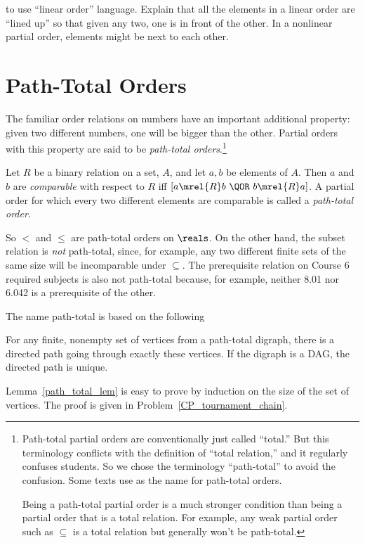 \begin{editingnotes}
 to use ``linear order'' language.  Explain that all the
elements in a linear order are ``lined up'' so that given any two, one
is in front of the other.  In a nonlinear partial order, elements
might be next to each other.
\end{editingnotes}

\section{Path-Total Orders}

The familiar order relations on numbers have an important additional
property: given two different numbers, one will be bigger than the
other.  Partial orders with this property are said to be
\emph{path-total orders}.\footnote{Path-total partial orders are
  conventionally just called ``total.''  But this terminology
  conflicts with the definition of ``total relation,'' and it
  regularly confuses students.  So we chose the terminology
  ``path-total'' to avoid the confusion.  Some texts use  as the name for path-total orders.

  Being a path-total partial order is a much stronger condition than
  being a partial order that is a total relation.  For example, any
  weak partial order such as $\subseteq$ is a total relation but
  generally won't be path-total.}

\begin{definition}\label{def:path_total}
Let $R$ be a binary relation on a set, $A$, and let $a, b$ be elements of
$A$.  Then $a$ and $b$ are \emph{comparable} with respect to $R$ iff $[a
  \mrel{R} b\ \QOR\ b \mrel{R} a]$.  A partial order for which every two
different elements are comparable is called a \emph{path-total order}.
\end{definition}

So $<$ and $\le$ are path-total orders on $\reals$.  On the other hand, the
subset relation is \emph{not} path-total, since, for example, any two different
finite sets of the same size will be incomparable under $\subseteq$.  The
prerequisite relation on Course 6 required subjects is also not path-total
because, for example, neither 8.01 nor 6.042 is a prerequisite of the
other.

The name path-total is based on the following
\begin{lemma}\label{path_total_lem} For any
  finite, nonempty set of vertices from a path-total digraph, there is
  a directed path going through exactly these vertices.  If
  the digraph is a DAG, the directed path is unique.
\end{lemma}
Lemma~\ref{path_total_lem} is easy to prove by induction on the size
of the set of vertices.  The proof is given in
Problem~\ref{CP_tournament_chain}.

